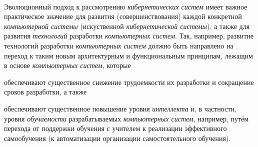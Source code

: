 \begin{scnsubstruct}
{        ~\\Эволюционный подход к рассмотрению \textit{кибернетических систем} имеет важное практическое значение для развития (совершенствования) каждой конкретной \textit{компьютерной системы} (искуственной \textit{кибернетической системы}), а также для развития \textit{технологий} разработки \textit{компьютерных систем}. Так, например, развитие технологий разработки \textit{компьютерных систем} должно быть направлено на переход к таким новым архитектурным и функциональным принципам, лежащим в основе \textit{компьютерных систем}, которые\begin{scnitemize}

            \item обеспечивают существенное снижение трудоемкости их разработки и сокращение сроков разработки, а также
            \item обеспечивают существенное повышение уровня \textit{интеллекта} и, в частности, уровня \textit{обучаемости} разрабатываемых \textit{компьютерных систем}, например, путём перехода от поддержки обучения с учителем к реализации эффективного самообучения (к автоматизации организации самостоятельного обучения).\end{scnitemize}
    }
\end{scnsubstruct}
